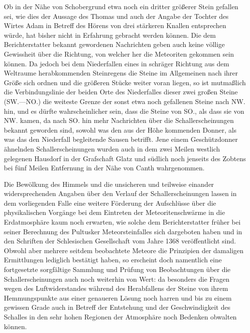 \documentclass[a4paper, 11pt, oneside]{article}
\begin{document}
Ob in der Nähe von Schobergrund etwa noch ein dritter größerer Stein gefallen sei, wie dies der Aussage des Thomas und auch der Angabe der Tochter des Wirtes Adam in Betreff des Hörens von drei stärkeren Knallen entsprechen würde, hat bisher nicht in Erfahrung gebracht werden können. Die dem Berichterstatter bekannt gewordenen Nachrichten geben auch keine völlige Gewissheit über die Richtung, von welcher her die Meteoriten gekommen sein können. Da jedoch bei dem Niederfallen eines in schräger Richtung aus dem Weltraume herabkommenden Steinregens die Steine im Allgemeinen nach ihrer Größe sich ordnen und die größeren Stücke weiter voran liegen, so ist mutmaßlich die Verbindungslinie der beiden Orte des Niederfalles dieser zwei großen Steine (SW.---NO.) die weiteste Grenze der sonst etwa noch gefallenen Steine nach NW. hin, und es dürfte wahrscheinlicher sein, dass die Steine von SO., als dass sie von NW. kamen, da nach SO. hin mehr Nachrichten über die Schallerscheinungen bekannt geworden sind, sowohl was den aus der Höhe kommenden Donner, als was das den Niederfall begleitende Sausen betrifft. Jene einem Geschützdonner ähnelnden Schallerscheinungen wurden auch in dem zwei Meilen westlich gelegenen Hausdorf in der Grafschaft Glatz und südlich noch jenseits des Zobtens bei fünf Meilen Entfernung in der Nähe von Canth wahrgenommen.

Die Bewölkung des Himmels und die unsicheren und teilweise einander widersprechenden Angaben über den Verlauf der Schallerscheinungen lassen in dem vorliegenden Falle eine weitere Förderung der Aufschlüsse über die physikalischen Vorgänge bei dem Eintreten der Meteoritenschwärme in die Erdatmosphäre kaum noch erwarten, wie solche dem Berichterstatter früher bei seiner Berechnung des Pultusker Meteorsteinfalles sich dargeboten haben und in den Schriften der Schlesischen Gesellschaft vom Jahre 1368 veröffentlicht sind. Obwohl aber mehrere seitdem beobachtete Meteore die Prinzipien der damaligen Ermittlungen lediglich bestätigt haben, so erscheint doch namentlich eine fortgesetzte sorgfältige Sammlung und Prüfung von Beobachtungen über die Schallerscheinungen auch noch weiterhin von Wert: da besonders die Fragen wegen des Luftwiderstandes während des Herabfallens der Steine von ihrem Hemmungspunkte aus einer genaueren Lösung noch harren und bis zu einem gewissen Grade auch in Betreff der Entstehung und der Geschwindigkeit des Schalles in den sehr hohen Regionen der Atmosphäre noch Bedenken obwalten können.
\end{document}
